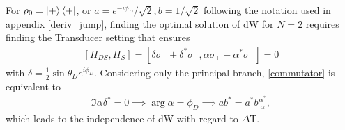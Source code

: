 For $\rho_0 = \ket{+} \bra{+}$, or $a = e^{-i \phi_D}/\sqrt{2}, b = 1/\sqrt{2}$ following the notation used in appendix \ref{deriv_jump}, finding the optimal solution of $\mathrm{dW}$ for $N = 2$ requires finding the Transducer setting that ensures
\begin{align}\label{commutator}
	[H_{DS}, H_S] = [\delta \sigma_{+} + \delta^* \sigma_{-}, \alpha \sigma_{+} + \alpha^* \sigma_{-}] = 0
\end{align}
with $\delta = \frac{1}{2} \sin{\theta_D} e^{i \phi_D}$.
Considering only the principal branch, \ref{commutator} is equivalent to
\begin{align*}
	\Im{\alpha \delta^*} = 0 \implies \arg{\alpha} = \phi_D \implies a b^* = a^* b \frac{\alpha^*}{\alpha},
\end{align*}
which leads to the independence of dW with regard to $\Delta \mathrm{T}$. 